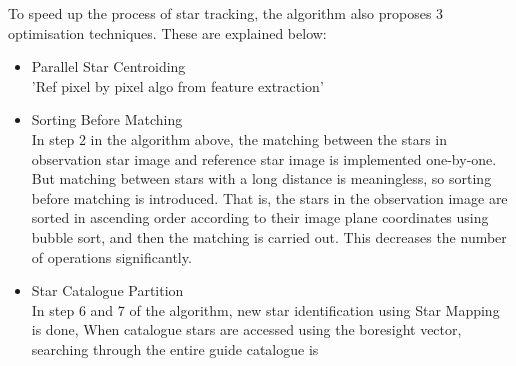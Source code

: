 \documentclass[../../main.tex]{subfiles}
\begin{document}
To speed up the process of star tracking, the algorithm also proposes 3 optimisation techniques. These are explained below:
\begin{itemize}
    \item Parallel Star Centroiding\\
    'Ref pixel by pixel algo from feature extraction'
    
    \item Sorting Before Matching\\
    In step 2 in the algorithm above, the matching between the stars in observation star image and reference star image is implemented one-by-one. But matching between stars with a long distance is meaningless, so sorting before matching is introduced. That is, the stars in the observation image are sorted in ascending order according to their image plane coordinates using bubble sort, and then the matching is carried out. This decreases the number of operations significantly. 
    
    \item Star Catalogue Partition\\
    In step 6 and 7 of the algorithm, new star identification using Star Mapping is done, When catalogue stars are accessed using the boresight vector, searching through the entire guide catalogue is 
\end{itemize}
\end{document}
